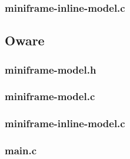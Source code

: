 \subsubsection{miniframe-inline-model.c}

\begin{scriptsize}
\begin{ttfamily}

\end{ttfamily}
\end{scriptsize}

\subsection{Oware}

\subsubsection{miniframe-model.h}

\begin{scriptsize}
\begin{ttfamily}

\end{ttfamily}
\end{scriptsize}

\subsubsection{miniframe-model.c}

\begin{scriptsize}
\begin{ttfamily}

\end{ttfamily}
\end{scriptsize}

\subsubsection{miniframe-inline-model.c}

\begin{scriptsize}
\begin{ttfamily}

\end{ttfamily}
\end{scriptsize}

\subsubsection{main.c}

